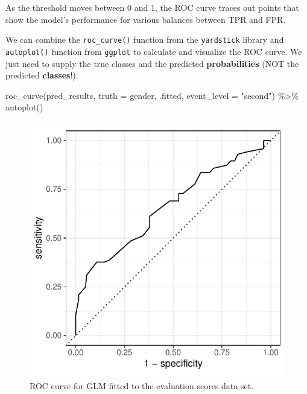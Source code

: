 \documentclass[
  letterpaper,
  DIV=11,
  numbers=noendperiod]{scrartcl}
\newenvironment{Shaded}{\begin{snugshade}}{\end{snugshade}}
\newcommand{\AttributeTok}[1]{\textcolor[rgb]{0.40,0.45,0.13}{#1}}
\newcommand{\FunctionTok}[1]{\textcolor[rgb]{0.28,0.35,0.67}{#1}}
\newcommand{\NormalTok}[1]{\textcolor[rgb]{0.00,0.23,0.31}{#1}}
\newcommand{\SpecialCharTok}[1]{\textcolor[rgb]{0.37,0.37,0.37}{#1}}
\newcommand{\StringTok}[1]{\textcolor[rgb]{0.13,0.47,0.30}{#1}}
\begin{document}
As the threshold moves between 0 and 1, the ROC curve traces out points
that show the model's performance for various balances between TPR and
FPR.

We can combine the \texttt{roc\_curve()} function from the
\texttt{yardstick} library and \texttt{autoplot()} function from
\texttt{ggplot} to calculate and visualize the ROC curve. We just need
to supply the true classes and the predicted \textbf{probabilities} (NOT
the predicted \textbf{classes}!).

\begin{Shaded}
\begin{Highlighting}[]
\FunctionTok{roc\_curve}\NormalTok{(pred\_results,}
          \AttributeTok{truth =}\NormalTok{ gender,}
\NormalTok{          .fitted,}
          \AttributeTok{event\_level =} \StringTok{"second"}\NormalTok{) }\SpecialCharTok{\%\textgreater{}\%}
  \FunctionTok{autoplot}\NormalTok{()}
\end{Highlighting}
\end{Shaded}

\begin{figure}[H]

{\centering \includegraphics{index_files/figure-pdf/unnamed-chunk-35-1.pdf}

}

\caption{ROC curve for GLM fitted to the evaluation scores data set.}

\end{figure}%
\end{document}
